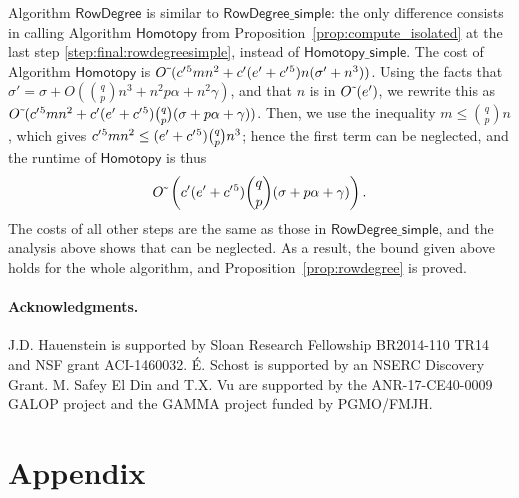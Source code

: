 \documentclass[12pt]{article}
\begin{document}
Algorithm $\mathsf{RowDegree}$ is similar to
$\mathsf{RowDegree\_simple}$: the only difference consists in calling
Algorithm $\mathsf{Homotopy}$ from
Proposition~\ref{prop:compute_isolated} at the last step
\eqref{step:final:rowdegreesimple}, instead of
$\mathsf{Homotopy\_simple}$. The cost of Algorithm
$\mathsf{Homotopy}$ is ${O}{\,\tilde{ }\,}({c'}{}^5 m n^2 + {c'}{}({e'}{}+{c'}{}^5) n(\sigma'
+ n^3))$.  Using the facts that $\sigma'= \sigma +O( {q \choose p} n^3
+ n^2 p \alpha+ n^2\gamma)$, and that $n$ is in ${O}{\,\tilde{ }\,}({e'}{})$, we
rewrite this as ${O}{\,\tilde{ }\,}({c'}{}^5 m n^2 + {c'}{}({e'}{}+{c'}{}^5 ) {q \choose
  p}(\sigma + p \alpha+ \gamma))$.  Then, we use the inequality $m \le
{q \choose p} n$, which gives ${c'}{}^5 m n^2 \le ({e'}{}+{c'}{}^5) {q \choose
  p} n^3$; hence the first term can be neglected, and the runtime of
$\mathsf{Homotopy}$ is thus
\[
{O}{\,\tilde{ }\,}\left( {c'}{}({e'}{}+{c'}{}^5 ) {q \choose p}(\sigma  +  p \alpha+ \gamma)\right).
\]
The costs of all other steps are the same as those in
$\mathsf{RowDegree\_simple}$, and the analysis above shows that can be
neglected. As a result, the bound given above holds for the whole
algorithm, and Proposition~\ref{prop:rowdegree} is proved.

\paragraph*{Acknowledgments.} J.D. Hauenstein is supported by Sloan
Research Fellowship BR2014-110 TR14 and NSF grant
ACI-1460032. \'E. Schost is supported by an NSERC Discovery
Grant. M. Safey El Din and T.X. Vu are supported by the
ANR-17-CE40-0009 GALOP project and the GAMMA project funded by
PGMO/FMJH.

\vspace{-0.5cm}



\section*{Appendix}\label{appendix}
\end{document}
